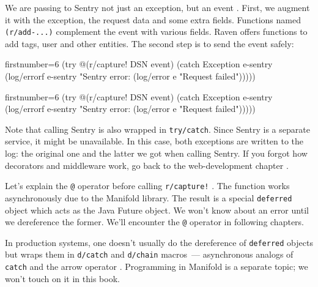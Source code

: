 \fi

We are passing to Sentry not just an exception, but an event . First, we augment it with the exception, the request data and some extra fields. Functions named \verb|(r/add-...)| complement the event with various fields. Raven offers functions to add tags, user and other entities. The second step is to send the event safely:

\ifnarrow

\begin{english}
  \begin{clojure/lines*}{firstnumber=6}
(try
  @(r/capture! DSN event)
  (catch Exception e-sentry
    (log/errorf
      e-sentry "Sentry error: %
    (log/error e "Request failed")))))
  \end{clojure/lines*}
\end{english}

\else

\begin{english}
  \begin{clojure/lines*}{firstnumber=6}
    (try
      @(r/capture! DSN event)
      (catch Exception e-sentry
        (log/errorf e-sentry "Sentry error: %
        (log/error e "Request failed")))))
  \end{clojure/lines*}
\end{english}

\fi

Note that calling Sentry is also wrapped in \verb|try/catch|. Since Sentry is a separate service, it might be unavailable. In this case, both exceptions are written to the log: the original one and the latter we got when calling Sentry. If you forgot how decorators and middleware work, go back to the web-development chapter .


Let's explain the \verb|@| operator before calling \verb|r/capture!| . The function works asynchronously due to the Manifold library. The result is a special \verb|deferred| object which acts as the Java Future object. We won't know about an error until we dereference the former. We'll encounter the \verb|@| operator in following chapters.

In production systems, one doesn't usually do the dereference of \verb|deferred| objects but wraps them in \verb|d/catch| and \verb|d/chain| macros~--- asynchronous analogs of \verb|catch| and the arrow operator \arr{}. Programming in Manifold is a separate topic; we won't touch on it in this book.

